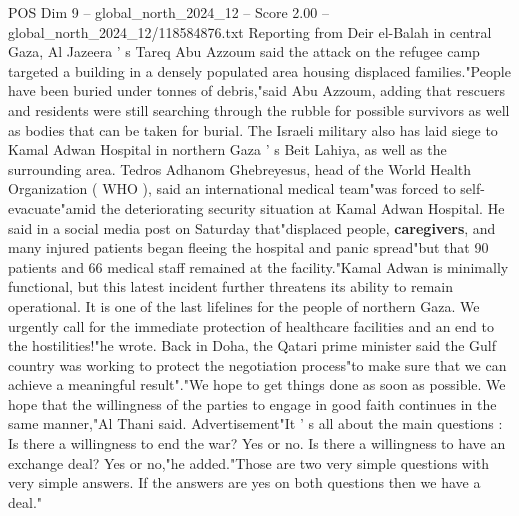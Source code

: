 \begin{textsample}{POS Dim 9 – global\_north\_2024\_12 – Score 2.00 – global\_north\_2024\_12/118584876.txt}
Reporting from Deir el-Balah in central Gaza, Al Jazeera ' s Tareq Abu Azzoum said the attack on the refugee camp targeted a building in a densely populated area housing displaced families."People have been buried under tonnes of debris,"said Abu Azzoum, adding that rescuers and residents were still searching through the rubble for possible survivors as well as bodies that can be taken for burial.
The Israeli military also has laid siege to Kamal Adwan Hospital in northern Gaza ' s Beit Lahiya, as well as the surrounding area.
Tedros Adhanom Ghebreyesus, head of the World Health Organization ( WHO ), said an international medical team"was forced to self-evacuate"amid the deteriorating security situation at Kamal Adwan Hospital.
He said in a social media post on Saturday that"displaced people, \textbf{caregivers}, and many injured patients began fleeing the hospital and panic spread"but that 90 patients and 66 medical staff remained at the facility."Kamal Adwan is minimally functional, but this latest incident further threatens its ability to remain operational.
It is one of the last lifelines for the people of northern Gaza.
We urgently call for the immediate protection of healthcare facilities and an end to the hostilities!"he wrote.
Back in Doha, the Qatari prime minister said the Gulf country was working to protect the negotiation process"to make sure that we can achieve a meaningful result"."We hope to get things done as soon as possible.
We hope that the willingness of the parties to engage in good faith continues in the same manner,"Al Thani said.
Advertisement"It ' s all about the main questions : Is there a willingness to end the war?
Yes or no.
Is there a willingness to have an exchange deal?
Yes or no,"he added."Those are two very simple questions with very simple answers.
If the answers are yes on both questions then we have a deal."

\end{textsample}
